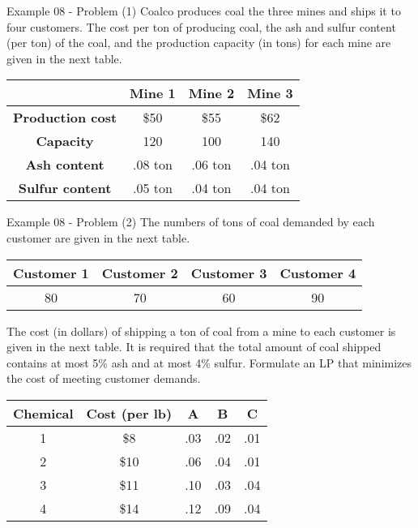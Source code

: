 \begin{frame}{Example 08 - Problem (1)}
Coalco produces coal the three mines and ships it to four customers. 
The cost per ton of producing coal, the ash and sulfur content (per ton) of the 
coal, and the production capacity (in tons) for each mine are given in the 
next table.

\begin{center}
\begin{tabular}{|c||c|c|c|}
\hline
& \cellcolor{gray90}\textbf{Mine 1} 
& \cellcolor{gray90}\textbf{Mine 2} 
& \cellcolor{gray90}\textbf{Mine 3} \\
\hline
\hline \cellcolor{gray90}\textbf{Production cost} & \$50    & \$55    & \$62 \\
\hline \cellcolor{gray90}\textbf{Capacity}        &  120    &  100    &  140 \\
\hline \cellcolor{gray90}\textbf{Ash content}     & .08 ton & .06 ton & .04 ton \\
\hline \cellcolor{gray90}\textbf{Sulfur content}  & .05 ton & .04 ton & .04 ton \\
\hline 
\end{tabular}
\end{center}

\end{frame}

\begin{frame}{Example 08 - Problem (2)}
The numbers of tons of coal demanded by each customer are given in the next 
table.

\begin{center}
\begin{tabular}{|c|c|c|c|}
\hline
  \cellcolor{gray90}\textbf{Customer 1} 
& \cellcolor{gray90}\textbf{Customer 2} 
& \cellcolor{gray90}\textbf{Customer 3} 
& \cellcolor{gray90}\textbf{Customer 4} \\
\hline
\hline 80 & 70 & 60 & 90 \\
\hline 
\end{tabular}
\end{center}

The cost (in dollars) of shipping a ton of coal from a mine to each customer 
is given in the next table. It is required that the total amount of coal shipped 
contains at most 5\% ash and at most 4\% sulfur. Formulate an LP that minimizes
the cost of meeting customer demands. 

\begin{center}
\begin{tabular}{|c|c|c|c|c|}
\hline
  \cellcolor{gray90}\textbf{Chemical} 
& \cellcolor{gray90}\textbf{Cost (per lb)} 
& \cellcolor{gray90}\textbf{A} 
& \cellcolor{gray90}\textbf{B} 
& \cellcolor{gray90}\textbf{C} \\
\hline
\hline 1 &  \$8 & .03 & .02 & .01 \\
\hline 2 & \$10 & .06 & .04 & .01 \\
\hline 3 & \$11 & .10 & .03 & .04 \\
\hline 4 & \$14 & .12 & .09 & .04 \\
\hline 
\end{tabular}
\end{center}

\end{frame}
